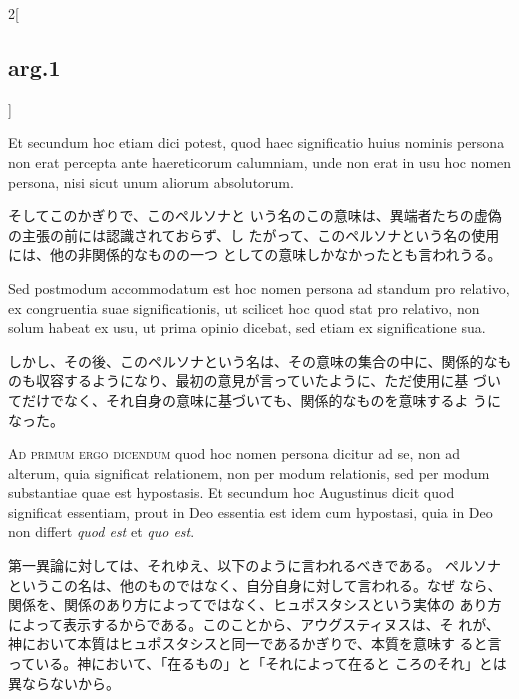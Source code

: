 \documentclass[paper=a4paper,fontsize=10pt,jafontsize=9pt,titlepage]{jlreq}
\begin{document}
\begin{paracol}{2}[\subsection{arg.1}]
\switchcolumn*

Et secundum hoc etiam
dici potest, quod haec significatio huius nominis persona non erat
percepta ante haereticorum calumniam, unde non erat in usu hoc nomen
persona, nisi sicut unum aliorum absolutorum.

\switchcolumn

そしてこのかぎりで、このペルソナと
 いう名のこの意味は、異端者たちの虚偽の主張の前には認識されておらず、し
 たがって、このペルソナという名の使用には、他の非関係的なものの一つ
 としての意味しかなかったとも言われうる。

\switchcolumn*

Sed postmodum accommodatum
est hoc nomen persona ad standum pro relativo, ex congruentia suae
significationis, ut scilicet hoc quod stat pro relativo, non solum
habeat ex usu, ut prima opinio dicebat, sed etiam ex significatione sua.

\switchcolumn

しかし、その後、このペルソナという名は、その意味の集合の中に、関係的なも
 のも収容するようになり、最初の意見が言っていたように、ただ使用に基
 づいてだけでなく、それ自身の意味に基づいても、関係的なものを意味するよ
 うになった。

\switchcolumn*[\subsection{ad.1}]

{\scshape Ad primum ergo dicendum} quod hoc nomen persona dicitur ad se, non ad
alterum, quia significat relationem, non per modum relationis, sed per
modum substantiae quae est hypostasis. Et secundum hoc Augustinus dicit
quod significat essentiam, prout in Deo essentia est idem cum hypostasi,
quia in Deo non differt {\itshape quod est} et {\itshape quo est}.

\switchcolumn

第一異論に対しては、それゆえ、以下のように言われるべきである。
ペルソナというこの名は、他のものではなく、自分自身に対して言われる。なぜ
 なら、関係を、関係のあり方によってではなく、ヒュポスタシスという実体の
 あり方によって表示するからである。このことから、アウグスティヌスは、そ
 れが、神において本質はヒュポスタシスと同一であるかぎりで、本質を意味す
 ると言っている。神において、「在るもの」と「それによって在ると
 ころのそれ」とは異ならないから。

\switchcolumn*[\subsection{ad.2}]


\end{paracol}
\end{document}
